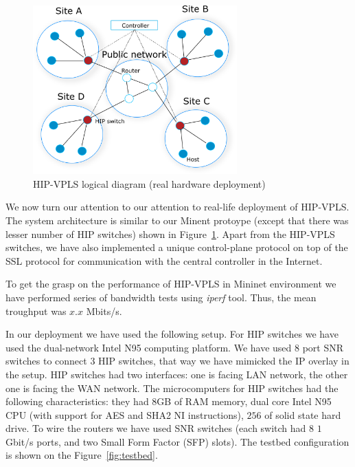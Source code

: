 \begin{figure}[h!]
    \centering
    \includegraphics[width=0.7\textwidth]{graphics/hw-hipls.png}
    \caption{HIP-VPLS logical diagram (real hardware deployment)}
    \label{fig:mininet}
\end{figure}

We now turn our attention to our attention to real-life deployment 
of HIP-VPLS. The system architecture is similar to our Minent protoype
(except that there was lesser number of HIP switches) shown in Figure~\ref{fig:mininet}. 
Apart from the HIP-VPLS switches, we have also implemented a unique 
control-plane protocol on top of the SSL protocol for communication 
with the central controller in the Internet.

To get the grasp on the performance of HIP-VPLS in Mininet environment we 
have performed series of bandwidth tests using {\it iperf} tool. Thus, the 
mean troughput was $x.x$ Mbits/s.

In our deployment we have used the following setup. For HIP switches we 
have used the dual-network Intel N95 computing platform. We have used $8$ 
port SNR switches to connect $3$ HIP switches, that way we have mimicked the 
IP overlay in the setup. HIP switches had two interfaces: one is facing 
LAN network, the other one is facing the WAN network. The microcomputers for
HIP switches had the following characteristics: they had $8$GB of RAM memory, 
dual core Intel N95 CPU (with support for AES and SHA2 NI instructions), $256$ of 
solid state hard drive. To wire the routers we have used SNR switches 
(each switch had $8$ $1$ Gbit/s ports, and two Small Form Factor (SFP) slots). 
The testbed configuration is shown on the Figure~\ref{fig:testbed}.

